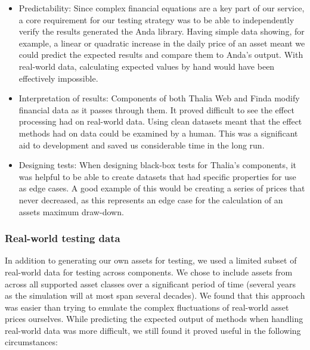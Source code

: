 \documentclass[main.tex]{subfiles}
\begin{document}
\begin{itemize}
    \item Predictability:
    Since complex financial equations are a key part of our service, a core requirement for our testing strategy was to be able to independently verify the results generated the Anda library. Having simple data showing, for example, a linear or quadratic increase in the daily price of an asset meant we could predict the expected results and compare them to Anda’s output. With real-world data, calculating expected values by hand would have been effectively impossible.
    
    \item Interpretation of results:
    Components of both Thalia Web and Finda modify financial data as it passes through them. It proved difficult to see the effect processing had on real-world data. Using clean datasets meant that the effect methods had on data could be examined by a human. This was a significant aid to development and saved us considerable time in the long run.
    
    \item Designing tests:
    When designing black-box tests for Thalia’s components, it was helpful to be able to create datasets that had specific properties for use as edge cases. A good example of this would be creating a series of prices that never decreased, as this represents an edge case for the calculation of an assets maximum draw-down.
\end{itemize}

\subsubsection{Real-world testing data}

In addition to generating our own assets for testing, we used a limited subset of real-world data for testing across components. We chose to include assets from across all supported asset classes over a significant period of time (several years as the simulation will at most span several decades). We found that this approach was easier than trying to emulate the complex fluctuations of real-world asset prices ourselves. While predicting the expected output of methods when handling real-world data was more difficult, we still found it proved useful in the following circumstances: 
\end{document}
